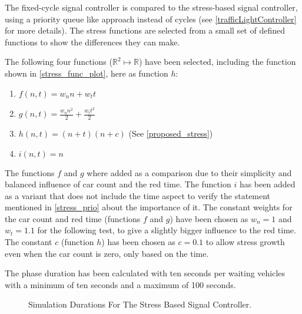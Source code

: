 The fixed-cycle signal controller is compared to the stress-based signal controller, using a priority queue like approach instead of cycles (see \autoref{trafficLightController} for more details). The stress functions are selected from a small set of defined functions to show the differences they can make.

The following four functions ($\mathbb{R}^2 \mapsto \mathbb{R}$) have been selected, including the function shown in \autoref{stress_func_plot}, here as function $h$:

\begin{enumerate}
	\item $f(n, t) = w_n n + w_tt$
	\item $g(n, t) = \frac{w_n n^2}{2} + \frac{w_t t^2}{2}$
	\item $h(n, t) = (n + t)(n + c)$ (See \autoref{proposed_stress})
	\item $i(n, t) = n$
\end{enumerate}

The functions $f$ and $g$ where added as a comparison due to their simplicity and balanced influence of car count and the red time. The function $i$ has been added as a variant that does not include the time aspect to verify the statement mentioned in \autoref{stress_prio} about the importance of it. The constant weights for the car count and red time (functions $f$ and $g$) have been chosen as $w_n = 1$ and $w_t = 1.1$ for the following test, to give a slightly bigger influence to the red time. The constant $c$ (function $h$) has been chosen as $c = 0.1$ to allow stress growth even when the car count is zero, only based on the time.

The phase duration has been calculated with ten seconds per waiting vehicles with a minimum of ten seconds and a maximum of 100 seconds.

\begin{figure}
\centering	
{}
\caption{Simulation Durations For The Stress Based Signal Controller.}
\label{stress_based_results}
\end{figure}

